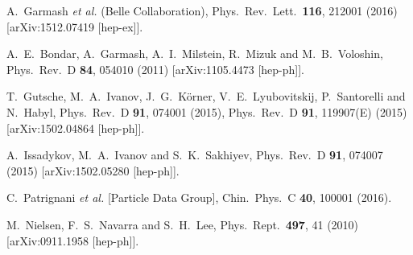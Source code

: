 \documentclass[aps,prd,floatfix,superscriptaddress,showpacs,showkeys]{revtex4}
\begin{document}
\begin{thebibliography}{99}
  A.~Garmash {\it et al.} (Belle Collaboration),
  Phys.\ Rev.\ Lett.\  {\bf 116}, 212001 (2016)  
  [arXiv:1512.07419 [hep-ex]].

  A.~E.~Bondar, A.~Garmash, A.~I.~Milstein, R.~Mizuk and M.~B.~Voloshin,
  Phys.\ Rev.\ D {\bf 84}, 054010 (2011) 
  [arXiv:1105.4473 [hep-ph]].

  T.~Gutsche, M.~A.~Ivanov, J.~G.~K\"orner, V.~E.~Lyubovitskij, 
  P.~Santorelli and N.~Habyl,
  Phys.\ Rev.\ D {\bf 91}, 074001 (2015), 
  Phys.\ Rev.\ D {\bf 91}, 119907(E) (2015)
  [arXiv:1502.04864 [hep-ph]].

  A.~Issadykov, M.~A.~Ivanov and S.~K.~Sakhiyev,
  Phys.\ Rev.\ D {\bf 91}, 074007 (2015)
  [arXiv:1502.05280 [hep-ph]].

  C.~Patrignani {\it et al.} [Particle Data Group],
  Chin.\ Phys.\ C {\bf 40}, 100001 (2016).

  M.~Nielsen, F.~S.~Navarra and S.~H.~Lee,
  Phys.\ Rept.\  {\bf 497}, 41 (2010)
  [arXiv:0911.1958 [hep-ph]].

\end{thebibliography}
\end{document}
